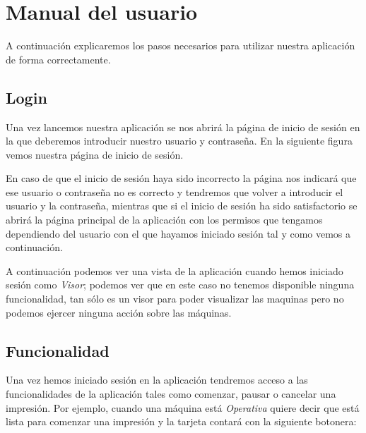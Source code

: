 \section{Manual del usuario}

A continuación explicaremos los pasos necesarios para utilizar nuestra aplicación de forma correctamente.

\subsection{Login}

Una vez lancemos nuestra aplicación se nos abrirá la página de inicio de sesión en la que deberemos introducir nuestro usuario y contraseña. En la siguiente figura vemos nuestra página de inicio de sesión.



En caso de que el inicio de sesión haya sido incorrecto la página nos indicará que ese usuario o contraseña no es correcto y tendremos que volver a introducir el usuario y la contraseña, mientras que si el inicio de sesión ha sido satisfactorio se abrirá la página principal de la aplicación con los permisos que tengamos dependiendo del usuario con el que hayamos iniciado sesión tal y como vemos a continuación.


A continuación podemos ver una vista de la aplicación cuando hemos iniciado sesión como \textit{Visor}; podemos ver que en este caso no tenemos disponible ninguna funcionalidad, tan sólo es un visor para poder visualizar las maquinas pero no podemos ejercer ninguna acción sobre las máquinas.


\subsection{Funcionalidad}

Una vez hemos iniciado sesión en la aplicación tendremos acceso a las funcionalidades de la aplicación tales como comenzar, pausar o cancelar una impresión. Por ejemplo, cuando una máquina está \textit{Operativa} quiere decir que está lista para comenzar una impresión y la tarjeta contará con la siguiente botonera:


